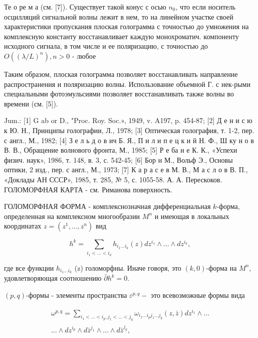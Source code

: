 \documentclass[10pt]{article}
\begin{document}
Те о ре м а (см. [7]). Существует такой конус с осью $n_{0}$, что если носитель осцилляций сигнальной волны лежит в нем, то на линейном участке своей характеристики пропускания плоская голограмма с точностью до умножения на комплексную константу восстанавливает каждую монохроматич. компоненту исходного сигнала, в том числе и ее поляризацию, с точностью до $O\left((\lambda / L)^{n}\right), n>0$ - любое



Таким образом, плоская голограмма позволяет восстанавливать направление распространения и поляризацию волны. Использование объемной Г. с нек-рыми специальными фотоэмульсиями позволяет восстанавливать также волны во времени (см. [5]).



Jum.: [1] G ab or D., "Proc. Roy. Soc.», 1949, v. A197, p. 454-87; [2] Д е н и с ю к Ю. Н., Принципы голографии, Л., 1978; [3] Оптическая голография, т. 1-2, пер. с англ., М., 1982; [4] З е л ь д о в ич Б. Я., П и л и п е ц к и й Н. Ф., Ш ку н о в В. В., Обращение волнового фронта, М., 1985; [5] Р е ба н е К. К., «Успехи физич. наук», 1986, т. 148, в. 3, с. 542-45; [6] Бор н М., Вольф Э., Основы оптики, 2 изд., пер. с англ., М., 1973; [7] К а р а с е в М. В., М а с л о в В. П., «Доклады АН СССР», 1985, т. 285, № 5, с. 1055-58. А. А. Перескоков. ГОЛОМОРФНАЯ КАРТА - см. Риманова поверхность.



ГОЛОМОРФНАЯ ФОРМА - комплекснозначная дифференциальная $k$-форма, определенная на комплексном многообразии $M^{n}$ и имеющая в локальных координатах $z=\left(z^{1}, \ldots, z^{n}\right)$ вид



\[

h^{k}=\sum_{i_{1}<\ldots<i_{k}} h_{i_{1} \ldots i_{k}}(z) d z^{i_{1}} \wedge \ldots \wedge d z^{i_{k}},

\]



где все функции $h_{i_{1} \ldots i_{k}}$ (z) голоморфны. Иначе говоря, это $(k, 0)$-форма на $M^{n}$, удовлетворяющая соотношению $\bar{\partial} h^{k}=0$.



$(p, q)$-формы - элементы пространства $\varepsilon^{p, q}-$ это всевозможные формы вида



\[

\begin{gathered}

\omega^{p, q}=\sum_{i_{1}<\ldots<i_{p}, j_{1}<\ldots<j_{q}} \omega_{i_{1} \ldots i_{p} j_{1} \ldots j_{q}}(z, \bar{z}) d z^{i_{1}} \wedge \ldots \\

\ldots \wedge d z^{i_{p}} \wedge d \bar{z}^{j_{1}} \wedge \ldots \wedge d \bar{z}^{j_{q}},

\end{gathered}

\]
\end{document}
